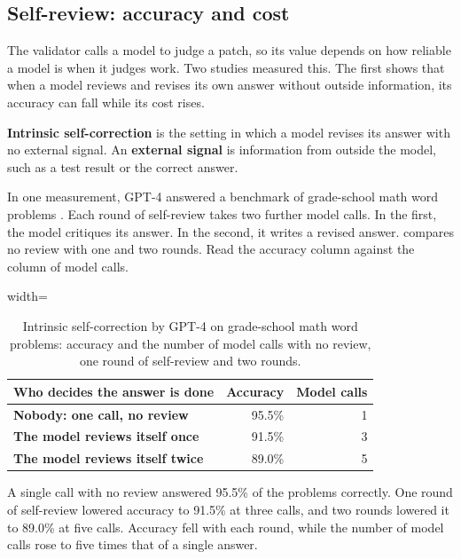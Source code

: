\subsection{Self-review: accuracy and cost}
\label{sec:planning-self-review}

The validator calls a model to judge a patch, so its value depends on how reliable a model is when it
judges work. Two studies measured this. The first shows that when a model reviews and revises its own
answer without outside information, its accuracy can fall while its cost rises.

\textbf{Intrinsic self-correction} is the setting in which a model revises its answer with no
external signal. An \textbf{external signal} is information from outside the model, such as a test
result or the correct answer.

In one measurement, GPT-4 answered a benchmark of grade-school math word problems
\citep[Table~3]{huang2024selfcorrect}. Each round of self-review takes two further model calls. In
the first, the model critiques its answer. In the second, it writes a revised answer.
 compares no review with one and two rounds. Read the accuracy column
against the column of model calls.

\begin{table}[htbp]
  \caption{Intrinsic self-correction by GPT-4 on grade-school math word problems: accuracy and the
  number of model calls with no review, one round of self-review and two rounds.}
  \label{tab:planning-self-review}
  \begin{adjustbox}{width=\linewidth}\begin{tabularx}{\linewidth}{Xrr}
    \toprule
    \textbf{Who decides the answer is done} & \textbf{Accuracy} & \textbf{Model calls} \\
    \midrule
    \textbf{Nobody: one call, no review} & 95.5\% & 1 \\
    \textbf{The model reviews itself once} & 91.5\% & 3 \\
    \textbf{The model reviews itself twice} & 89.0\% & 5 \\
    \bottomrule
  \end{tabularx}\end{adjustbox}
\end{table}

A single call with no review answered 95.5\% of the problems correctly. One round of self-review
lowered accuracy to 91.5\% at three calls, and two rounds lowered it to 89.0\% at five calls.
Accuracy fell with each round, while the number of model calls rose to five times that of a single
answer.

